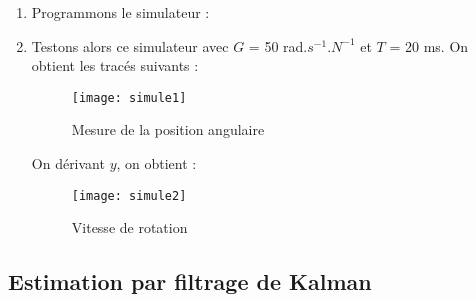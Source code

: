\documentclass[12pt,a4paper,titlepage]{article}
\begin{document}
\begin{enumerate}

    \item{Programmons le simulateur :
            
        }

    \item{Testons alors ce simulateur avec $G$ = 50 rad.$s^{-1}$.$N^{-1}$ et $T$ = 20 ms.
            On obtient les tracés suivants :

            \begin{figure}[H]
                \caption{Mesure de la position angulaire}
                \texttt{[image: simule1]}
                \centering
            \end{figure}

            On dérivant $y$, on obtient :

            \begin{figure}[H]
                \caption{Vitesse de rotation}
                \texttt{[image: simule2]}
                \centering
            \end{figure}
        }

\end{enumerate}

\subsection{Estimation par filtrage de Kalman}
\end{document}

